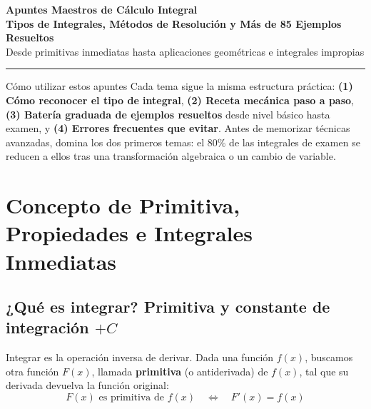 \documentclass[10pt,a4paper]{article}
\begin{document}
\thispagestyle{plain}

\begin{center}
  {\LARGE \textbf{\color{mainblue} Apuntes Maestros de Cálculo Integral}}\\[2.5mm]
  {\large \textbf{Tipos de Integrales, Métodos de Resolución y Más de 85 Ejemplos Resueltos}}\\[2mm]
  {\small \color{slatetext} Desde primitivas inmediatas hasta aplicaciones geométricas e integrales impropias}
\end{center}

\vspace{2mm}
\hrule
\vspace{3mm}

\begin{formulabox}{Cómo utilizar estos apuntes}
Cada tema sigue la misma estructura práctica: \textbf{(1) Cómo reconocer el tipo de integral}, \textbf{(2) Receta mecánica paso a paso}, \textbf{(3) Batería graduada de ejemplos resueltos} desde nivel básico hasta examen, y \textbf{(4) Errores frecuentes que evitar}. Antes de memorizar técnicas avanzadas, domina los dos primeros temas: el $80\%$ de las integrales de examen se reducen a ellos tras una transformación algebraica o un cambio de variable.
\end{formulabox}

\renewcommand{\contentsname}{Índice General de Contenidos}
{\footnotesize
\tableofcontents
}

\newpage

\section{Concepto de Primitiva, Propiedades e Integrales Inmediatas}

\subsection{¿Qué es integrar? Primitiva y constante de integración \texorpdfstring{$+C$}{+C}}

Integrar es la operación inversa de derivar. Dada una función $f(x)$, buscamos otra función $F(x)$, llamada \textbf{primitiva} (o antiderivada) de $f(x)$, tal que su derivada devuelva la función original:
$$F(x) \text{ es primitiva de } f(x) \quad \Longleftrightarrow \quad F'(x) = f(x)$$
\end{document}
